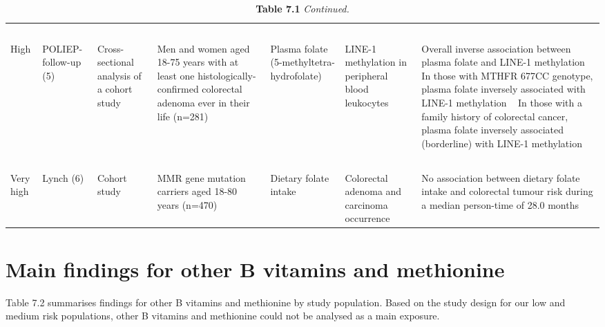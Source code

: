 \begin{sidewaystable} 
\caption*{\textbf{Table 7.1} \emph{Continued.}}
\label{table7_1}
\begin{tabular}{L{1.3cm}C{1.5cm}C{2cm}C{2.1cm}C{2.1cm}C{2.1cm}C{3.7cm}}

~ & ~ & ~ & ~ & ~ & ~ & ~ \\

High & POLIEP-follow-up (5) & Cross-sectional analysis of a cohort 
study & Men and women aged 18-75 years with at 
least one histologically-confirmed colorectal adenoma ever in their 
life (n=281) & Plasma folate (5-methyltetra-hydrofolate) & LINE-1 methylation in peripheral blood 
leukocytes & { Overall inverse association between plasma folate and LINE-1 methylation} ~ { In those with MTHFR 677CC genotype, plasma folate inversely associated with LINE-1 methylation} ~ In those with a family history of 
colorectal cancer, plasma folate inversely associated (borderline) with 
LINE-1 methylation\\
~ & ~ & ~ & ~ & ~ & ~ & ~ \\
Very high & Lynch (6) & Cohort study & MMR gene mutation carriers aged 18-80 
years (n=470) & Dietary folate intake & Colorectal adenoma and carcinoma 
occurrence & No association between dietary folate 
intake and colorectal tumour risk during a median person-time of 28.0 
months\\

\hline
\end{tabular}
\end{sidewaystable}


\section[]{Main findings for other B vitamins and methionine} %
\noindent Table 7.2 summarises findings for other B vitamins and methionine by study population. Based on the study design for our low and medium risk populations, other B vitamins and methionine could not be analysed as a main exposure.

